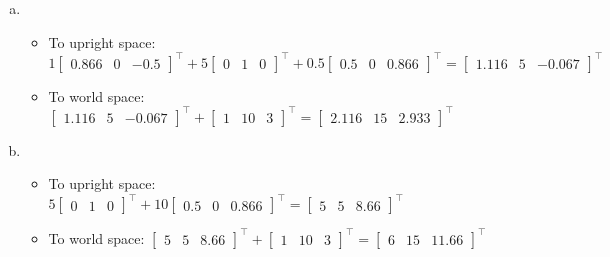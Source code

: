\documentclass[11pt]{article}
\begin{document}
\begin{enumerate}[a.]
	\item %
	\begin{itemize}
		\item To upright space: $1\begin{bmatrix}
			0.866 & 0 & -0.5
			\end{bmatrix}^\intercal
			+ 5\begin{bmatrix}
				0 & 1 & 0
			\end{bmatrix}^\intercal 
			+ 0.5\begin{bmatrix}
				0.5 & 0 & 0.866
			\end{bmatrix}^\intercal =
			\begin{bmatrix}
				1.116 & 5 & -0.067
			\end{bmatrix}^\intercal$
		\item To world space: $\begin{bmatrix}
				1.116 & 5 & -0.067
			\end{bmatrix}^\intercal
			+ \begin{bmatrix}
				1 & 10 & 3
			\end{bmatrix}^\intercal
			= \begin{bmatrix}
				2.116 & 15 & 2.933
			\end{bmatrix}^\intercal$
	\end{itemize}
	
	\item %
	\begin{itemize}
		\item To upright space: $5\begin{bmatrix}
				0 & 1 & 0
			\end{bmatrix}^\intercal 
			+ 10\begin{bmatrix}
				0.5 & 0 & 0.866
			\end{bmatrix}^\intercal =
			\begin{bmatrix}
				5 & 5 & 8.66
			\end{bmatrix}^\intercal$
		\item To world space: $\begin{bmatrix}
				5 & 5 & 8.66
			\end{bmatrix}^\intercal
			+ \begin{bmatrix}
				1 & 10 & 3
			\end{bmatrix}^\intercal
			= \begin{bmatrix}
				6 & 15 & 11.66
			\end{bmatrix}^\intercal$
	\end{itemize}
	

\end{enumerate}
\end{document}
